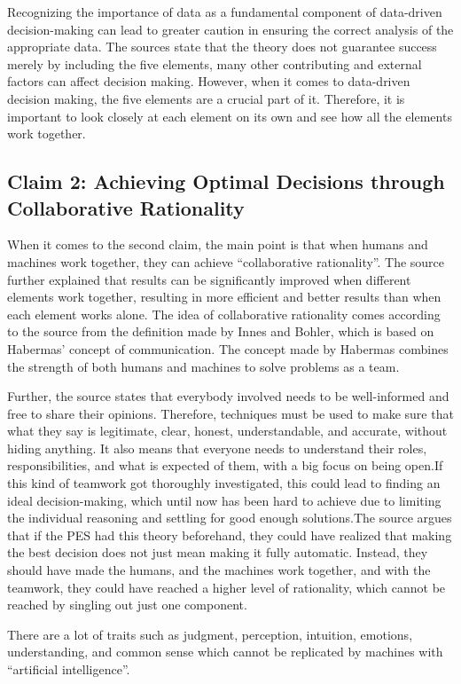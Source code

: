 Recognizing the importance of data as a fundamental component of data-driven decision-making can lead to greater caution in ensuring the correct analysis of the appropriate data.
The sources state that the theory does not guarantee success merely by including the five elements, many other contributing and external factors can affect decision making. However, when it comes to data-driven decision making, the five elements are a crucial part of it. Therefore, it is important to look closely at each element on its own and see how all the elements work together. 

\subsection{Claim 2: Achieving Optimal Decisions through Collaborative Rationality}
When it comes to the second claim, the main point is that when humans and machines work together, they can achieve “collaborative rationality”. The source further explained that results can be significantly improved when different elements work together, resulting in more efficient and better results than when each element works alone. The idea of collaborative rationality comes according to the source from the definition made by Innes and Bohler, which is based on Habermas’ concept of communication. The concept made by Habermas combines the strength of both humans and machines to solve problems as a team. 

Further, the source states that everybody involved needs to be well-informed and free to share their opinions. Therefore, techniques must be used to make sure that what they say is legitimate, clear, honest, understandable, and accurate, without hiding anything. It also means that everyone needs to understand their roles, responsibilities, and what is expected of them, with a big focus on being open.If this kind of teamwork got thoroughly investigated, this could lead to finding an ideal decision-making, which until now has been hard to achieve due to limiting the individual reasoning and settling for good enough solutions.The source argues that if the PES had this theory beforehand, they could have realized that making the best decision does not just mean making it fully automatic. Instead, they should have made the humans, and the machines work together, and with the teamwork, they could have reached a higher level of rationality, which cannot be reached by singling out just one component. 

There are a lot of traits such as judgment, perception, intuition, emotions, understanding, and common sense which cannot be replicated by machines with “artificial intelligence”. 


